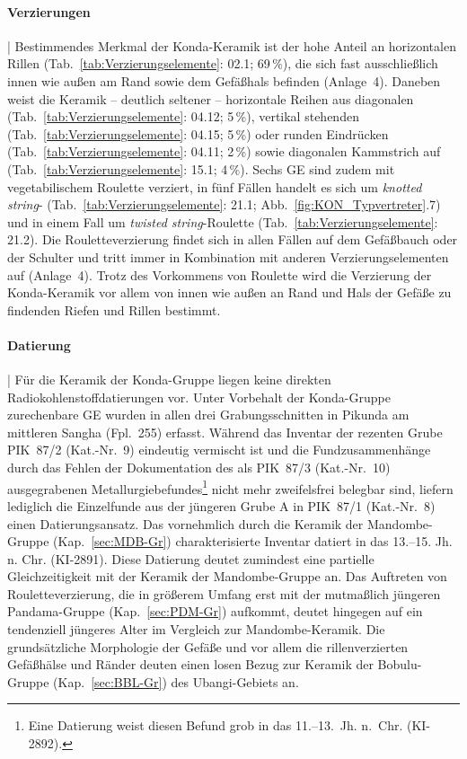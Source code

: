 \paragraph{Verzierungen}\hspace{-.5em}|\hspace{.5em}%
Bestimmendes Merkmal der Konda-Keramik ist der hohe Anteil an horizontalen Rillen (Tab.~\ref{tab:Verzierungselemente}: 02.1; 69\,\%), die sich fast ausschließlich innen wie außen am Rand sowie dem Gefäßhals befinden (Anlage~4). Daneben weist die Keramik -- deutlich seltener -- horizontale Reihen aus diagonalen (Tab.~\ref{tab:Verzierungselemente}: 04.12; 5\,\%), vertikal stehenden (Tab.~\ref{tab:Verzierungselemente}: 04.15; 5\,\%) oder runden Eindrücken (Tab.~\ref{tab:Verzierungselemente}: 04.11; 2\,\%) sowie diagonalen Kammstrich auf (Tab.~\ref{tab:Verzierungselemente}: 15.1; 4\,\%). Sechs GE sind zudem mit vegetabilischem \mbox{Roulette} verziert, in fünf Fällen handelt es sich um \textit{knotted string}- (Tab.~\ref{tab:Verzierungselemente}: 21.1; Abb.~\ref{fig:KON_Typvertreter}.7) und in einem Fall um \textit{twisted string}-\mbox{Roulette} (Tab.~\ref{tab:Verzierungselemente}: 21.2). Die Rouletteverzierung findet sich in allen Fällen auf dem Gefäßbauch oder der Schulter und tritt immer in Kombination mit anderen Verzierungselementen auf (Anlage~4). Trotz des Vorkommens von \mbox{Roulette} wird die Verzierung der Konda-Keramik vor allem von innen wie außen an Rand und Hals der Gefäße zu findenden Riefen und Rillen bestimmt.

\paragraph{Datierung}\hspace{-.5em}|\hspace{.5em}%
Für die Keramik der Konda-Gruppe liegen keine direkten Radiokohlenstoffdatierungen vor. Unter Vorbehalt der Konda-Gruppe zurechenbare GE wurden in allen drei Grabungsschnitten in Pikunda am mittleren \mbox{Sangha} (Fpl.~255) erfasst. Während das Inventar der rezenten Grube PIK~87/2 (Kat.-Nr.~9) eindeutig vermischt ist und die Fundzusammenhänge durch das Fehlen der Dokumentation des als PIK~87/3 (Kat.-Nr.~10) ausgegrabenen Metallurgiebefundes\footnote{Eine Datierung weist diesen Befund grob in das 11.--13.~Jh. n.~Chr. (KI-2892).} nicht mehr zweifelsfrei belegbar sind, liefern lediglich die Einzelfunde aus der jüngeren Grube A in PIK~87/1 (Kat.-Nr.~8) einen Datierungsansatz. Das vornehmlich durch die Keramik der Mandombe-Gruppe (Kap.~\ref{sec:MDB-Gr}) charakterisierte Inventar datiert in das 13.--15. Jh. n. Chr. (KI-2891). Diese Datierung deutet zumindest eine partielle Gleichzeitigkeit mit der Keramik der Mandombe-Gruppe an. Das Auftreten von Rouletteverzierung, die in größerem Umfang erst mit der mutmaßlich jüngeren Pandama-Gruppe (Kap.~\ref{sec:PDM-Gr}) aufkommt, deutet hingegen auf ein tendenziell jüngeres Alter im Vergleich zur Mandombe-Keramik. Die grundsätzliche Morphologie der Gefäße und vor allem  die rillenverzierten Gefäßhälse und Ränder deuten einen losen Bezug zur Keramik der Bobulu-Gruppe (Kap.~\ref{sec:BBL-Gr}) des \mbox{Ubangi}-Gebiets an.

